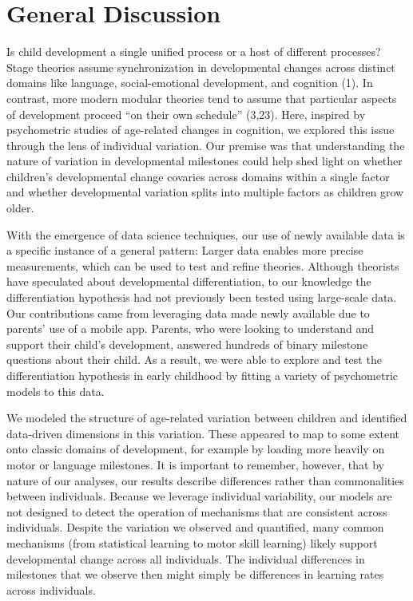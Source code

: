 \documentclass[man]{apa7}
\begin{document}
\hypertarget{discussion}{%
\section*{General Discussion}\label{discussion}}

Is child development a single uniﬁed process or a host of different
processes? Stage theories assume synchronization in developmental
changes across distinct domains like language, social-emotional
development, and cognition (1). In contrast, more modern modular theories
tend to assume that particular aspects of development proceed ``on their
own schedule'' (3,23). Here, inspired by psychometric studies of
age-related changes in cognition, we explored this issue through the lens of individual variation. Our premise was that
understanding the nature of variation in developmental milestones could help shed
light on whether children's developmental change covaries across domains
within a single factor and whether developmental variation splits into multiple factors as children grow older.

With the emergence of data science techniques, our use of newly
available data is a specific instance of a general pattern: Larger data
enables more precise measurements, which can be used to test and refine theories.
Although theorists have speculated about developmental differentiation,
to our knowledge the differentiation hypothesis had not previously been tested using large-scale
data. Our contributions came from leveraging data made newly available
due to parents' use of a mobile app. Parents, who were looking to understand and
support their child's development, answered hundreds of binary milestone
questions about their child. As a result, we were able to explore and
test the differentiation hypothesis in early childhood by fitting a
variety of psychometric models to this data.

We modeled the structure of age-related variation between children and identified data-driven dimensions in this variation. These appeared to map to some extent onto classic domains of development, for example by loading more heavily on motor or language milestones.
It is important to remember, however, that by nature of our analyses, our results describe differences rather than commonalities between individuals. Because we leverage individual variability, our models are not designed to detect the operation of mechanisms that are consistent across individuals. Despite the variation we observed and quantified,
many common mechanisms (from statistical learning to motor skill learning) likely support developmental change across all individuals. The individual differences in milestones that we observe then might simply be differences in  learning rates across individuals.
\end{document}
